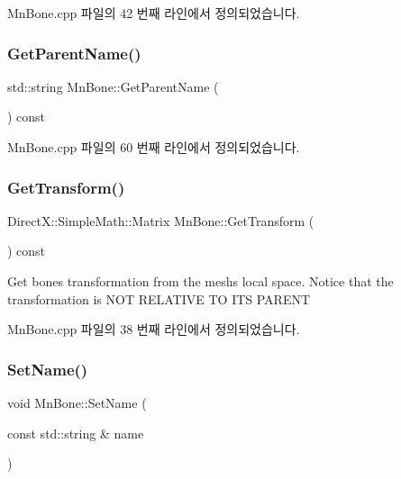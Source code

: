 Mn\+Bone.\+cpp 파일의 42 번째 라인에서 정의되었습니다.

\mbox{\label{class_m_n_l_1_1_mn_bone_a476cfd8bcfebded34cbcbfd08d6a44b2}} 
\subsubsection{\texorpdfstring{Get\+Parent\+Name()}{GetParentName()}}
{\footnotesize\ttfamily std\+::string Mn\+Bone\+::\+Get\+Parent\+Name (\begin{DoxyParamCaption}{ }\end{DoxyParamCaption}) const}



Mn\+Bone.\+cpp 파일의 60 번째 라인에서 정의되었습니다.

\mbox{\label{class_m_n_l_1_1_mn_bone_a404d1fc423d63715cd0a8bbe3afdaac7}} 
\subsubsection{\texorpdfstring{Get\+Transform()}{GetTransform()}}
{\footnotesize\ttfamily Direct\+X\+::\+Simple\+Math\+::\+Matrix Mn\+Bone\+::\+Get\+Transform (\begin{DoxyParamCaption}{ }\end{DoxyParamCaption}) const}

Get bone\textquotesingle{}s transformation from the mesh\textquotesingle{}s local space. Notice that the transformation is N\+OT R\+E\+L\+A\+T\+I\+VE TO I\+TS P\+A\+R\+E\+NT 

Mn\+Bone.\+cpp 파일의 38 번째 라인에서 정의되었습니다.

\mbox{\label{class_m_n_l_1_1_mn_bone_a36b9b60148969ce31bc74a4bbd4c56cf}} 
\subsubsection{\texorpdfstring{Set\+Name()}{SetName()}}
{\footnotesize\ttfamily void Mn\+Bone\+::\+Set\+Name (\begin{DoxyParamCaption}\item[{const std\+::string \&}]{name }\end{DoxyParamCaption})}



